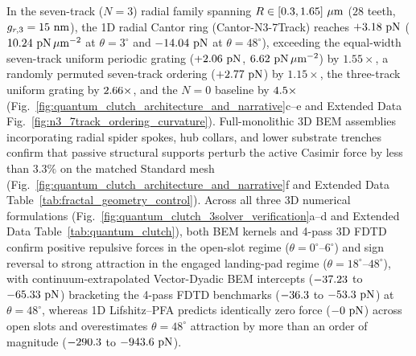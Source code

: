 \documentclass[pdflatex,sn-nature]{sn-jnl}
\DeclareRobustCommand{\roundone}[1]{\fpeval{round(#1,1)}}
\DeclareRobustCommand{\roundtwo}[1]{\fpeval{round(#1,2)}}
\begin{document}
In the seven-track ($N=3$) radial family spanning $R \in [0.3{}, 1.65{}]\ \mu\text{m}$ ($28$ teeth, $g_{r,3} = 15{}\text{ nm}$), the 1D radial Cantor ring (Cantor-N3-7Track) reaches $+\roundtwo{\FractalNthreeCantorseventrackBemThetathreeFZPn}\text{ pN}$ ($\roundtwo{\NatureFractalNthreeCantorseventrackFRepPnPerToothAreaUmtwo}\text{ pN}\,\mu\text{m}^{-2}$ at $\theta=3^\circ$ and $\roundtwo{\FractalNthreeCantorseventrackBemThetafoureightFZPn}\text{ pN}$ at $\theta=48^\circ$), exceeding the equal-width seven-track uniform periodic grating ($+\roundtwo{\NthreeCurvCylUniformFzPn}\text{ pN}$, $\roundtwo{\NthreeUnithreedCtrlUnizerozerozeroFa}\text{ pN}\,\mu\text{m}^{-2}$) by $1.55\times$, a randomly permuted seven-track ordering ($+\roundtwo{\NthreeCurvCylShuffledFzPn}\text{ pN}$) by $1.15\times$, the three-track uniform grating by $2.66{}\times$, and the $N=0$ baseline by $4.5{}\times$ (Fig.~\ref{fig:quantum_clutch_architecture_and_narrative}c--e and Extended Data Fig.~\ref{fig:n3_7track_ordering_curvature}). Full-monolithic 3D BEM assemblies incorporating radial spider spokes, hub collars, and lower substrate trenches confirm that passive structural supports perturb the active Casimir force by less than $3.3\%$ on the matched Standard mesh (Fig.~\ref{fig:quantum_clutch_architecture_and_narrative}f and Extended Data Table~\ref{tab:fractal_geometry_control}). Across all three 3D numerical formulations (Fig.~\ref{fig:quantum_clutch_3solver_verification}a--d and Extended Data Table~\ref{tab:quantum_clutch}), both BEM kernels and 4-pass 3D FDTD confirm positive repulsive forces in the open-slot regime ($\theta = 0^\circ\text{--}6^\circ$) and sign reversal to strong attraction in the engaged landing-pad regime ($\theta = 18^\circ\text{--}48^\circ$), with continuum-extrapolated Vector-Dyadic BEM intercepts ($\roundtwo{\RotCeightCompactNtwoBemThetafoureightContinuumFZPn}$ to $\roundtwo{\RotCfourTightslotNtwoBemThetafoureightRichardsonFZPn}\text{ pN}$) bracketing the 4-pass FDTD benchmarks ($\roundtwo{\RotCeightCompactNtwoMeepThetafoureightFZPn}$ to $\roundtwo{\RotCfourTightslotNtwoMeepThetafoureightFZPn}\text{ pN}$) at $\theta=48^\circ$, whereas 1D Lifshitz--PFA predicts identically zero force ($-0{}\text{ pN}$) across open slots and overestimates $\theta=48^\circ$ attraction by more than an order of magnitude ($\roundone{\RotCeightCompactNtwoHighThetaZerofoureightpzeroLifshitzPfaFZPn}$ to $\roundone{\RotCfourTightslotNtwoHighThetaZerofoureightpzeroLifshitzPfaFZPn}\text{ pN}$).
\end{document}
